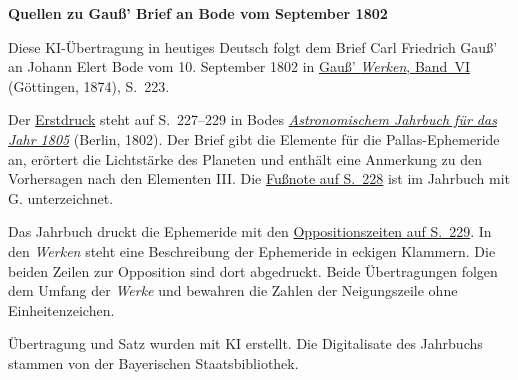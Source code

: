 \clearpage\thispagestyle{empty}
\begin{center}\textbf{Quellen zu Gauß’ Brief an Bode vom September 1802}\end{center}
\noindent Diese KI-Übertragung in heutiges Deutsch folgt dem Brief Carl Friedrich Gauß’ an Johann Elert Bode vom 10. September 1802 in \href{https://gdz.sub.uni-goettingen.de/id/PPN236007467}{Gauß’ \textit{Werken}, Band~VI} (Göttingen, 1874), S.~223.
\par\smallskip\noindent Der \href{https://api.digitale-sammlungen.de/iiif/image/v2/bsb10538334_00237/full/1450,/0/default.jpg}{Erstdruck} steht auf S.~227--229 in Bodes \href{https://wwwadd.zah.uni-heidelberg.de/publikationen/baj/baj1805/baj1805.htm}{\textit{Astronomischem Jahrbuch für das Jahr 1805}} (Berlin, 1802). Der Brief gibt die Elemente für die Pallas-Ephemeride an, erörtert die Lichtstärke des Planeten und enthält eine Anmerkung zu den Vorhersagen nach den Elementen III. Die \href{https://api.digitale-sammlungen.de/iiif/image/v2/bsb10538334_00238/full/1450,/0/default.jpg}{Fußnote auf S.~228} ist im Jahrbuch mit G. unterzeichnet.
\par\smallskip\noindent Das Jahrbuch druckt die Ephemeride mit den \href{https://api.digitale-sammlungen.de/iiif/image/v2/bsb10538334_00239/full/1450,/0/default.jpg}{Oppositionszeiten auf S.~229}. In den \textit{Werken} steht eine Beschreibung der Ephemeride in eckigen Klammern. Die beiden Zeilen zur Opposition sind dort abgedruckt. Beide Übertragungen folgen dem Umfang der \textit{Werke} und bewahren die Zahlen der Neigungszeile ohne Einheitenzeichen.
\par\smallskip\noindent Übertragung und Satz wurden mit KI erstellt. Die Digitalisate des Jahrbuchs stammen von der Bayerischen Staatsbibliothek.
\clearpage
